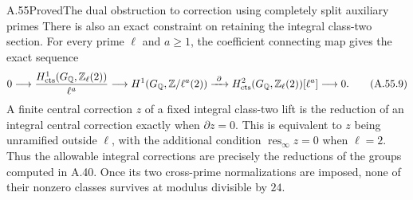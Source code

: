 \begin{statement}{A.55}{Proved}{The dual obstruction to correction using completely split auxiliary primes}
There is also an exact constraint on retaining the integral
class-two section.  For every prime $\ell$ and $a\ge1$, the
coefficient connecting map gives the exact sequence
\[
 0\longrightarrow
 \frac{H^1_{\rm cts}(G_\mathbb Q,\mathbb Z_\ell(2))}{\ell^a}
 \longrightarrow H^1(G_\mathbb Q,\mathbb Z/\ell^a(2))
 \xrightarrow{\ \partial\ }
 H^2_{\rm cts}(G_\mathbb Q,\mathbb Z_\ell(2))[\ell^a]
 \longrightarrow0.
 \tag{A.55.9}
\]
A finite central correction $z$ of a fixed integral class-two
lift is the reduction of an integral central correction exactly
when $\partial z=0$.  This is equivalent to $z$ being unramified
outside $\ell$, with the additional condition
$\operatorname{res}_\infty z=0$ when $\ell=2$.
Thus the allowable integral corrections are precisely the
reductions of the groups computed in A.40.  Once its two
cross-prime normalizations are imposed, none of their nonzero
classes survives at modulus divisible by $24$.
\end{statement}
